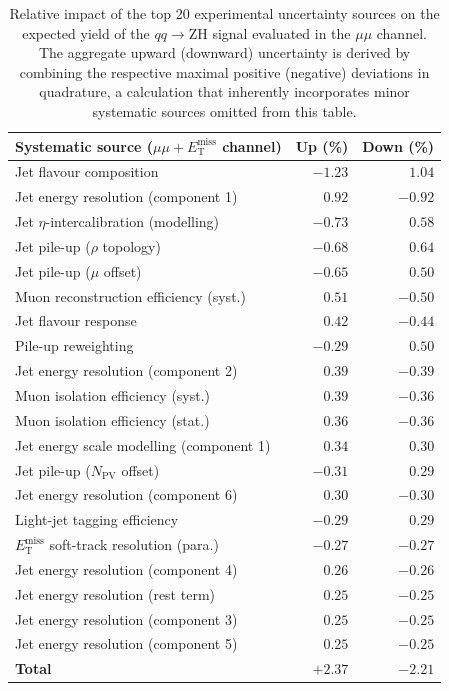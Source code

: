 \begin{table}[!htbp]
\centering
\begin{tabular}{lrr}
\toprule
\textbf{Systematic source} ($\mu\mu + E_{\text{T}}^{\text{miss}}$ channel) & \textbf{Up (\%)} & \textbf{Down (\%)} \\
\midrule
Jet flavour composition                         & $-1.23$ &  $1.04$ \\
Jet energy resolution (component 1)             &  $0.92$ & $-0.92$ \\
Jet $\eta$-intercalibration (modelling)         & $-0.73$ &  $0.58$ \\
Jet pile-up ($\rho$ topology)                   & $-0.68$ &  $0.64$ \\
Jet pile-up ($\mu$ offset)                      & $-0.65$ &  $0.50$ \\
Muon reconstruction efficiency (syst.)          &  $0.51$ & $-0.50$ \\                                
Jet flavour response                            &  $0.42$ & $-0.44$ \\
Pile-up reweighting                             & $-0.29$ &  $0.50$ \\
Jet energy resolution (component 2)             &  $0.39$ & $-0.39$ \\ 
Muon isolation efficiency (syst.)               &  $0.39$ & $-0.36$ \\
Muon isolation efficiency (stat.)               &  $0.36$ & $-0.36$ \\
Jet energy scale modelling (component 1)        &  $0.34$ &  $0.30$ \\
Jet pile-up ($N_{\text{PV}}$ offset)            & $-0.31$ &  $0.29$ \\
Jet energy resolution (component 6)             &  $0.30$ & $-0.30$ \\
Light-jet tagging efficiency                    & $-0.29$ &  $0.29$ \\
$E_{\text{T}}^{\text{miss}}$ soft-track resolution (para.) & $-0.27$ & $-0.27$ \\
Jet energy resolution (component 4)             &  $0.26$ & $-0.26$ \\
Jet energy resolution (rest term)               &  $0.25$ & $-0.25$ \\
Jet energy resolution (component 3)             &  $0.25$ & $-0.25$ \\
Jet energy resolution (component 5)             &  $0.25$ & $-0.25$ \\
\midrule
\textbf{Total}  & $+2.37$ & $-2.21$ \\
\bottomrule
\end{tabular}
\caption{\rm Relative impact of the top 20 experimental uncertainty sources on the expected yield of the $qq \to \text{ZH}$ signal evaluated in the $\mu\mu$ channel. The aggregate upward (downward) uncertainty is derived by combining the respective maximal positive (negative) deviations in quadrature, a calculation that inherently incorporates minor systematic sources omitted from this table.}
\label{tab:syst-uncertainties-mm}
\end{table}

